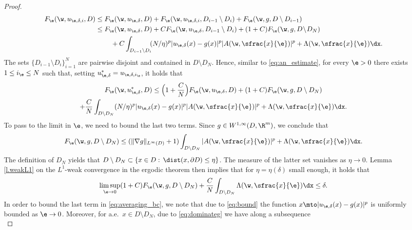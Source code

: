 \begin{proof}
\begin{align*}
F_{\e}(\w,u_{\e,\delta,i},D)&\leq F_{\e}(\w,u_{\e,\delta},D)+F_{\e}(\w,u_{\e,\delta,i},D_{i-1}\setminus D_i)+F_{\e}(\w,g,D\setminus D_{i-1})
\\
&\leq F_{\e}(\w,u_{\e,\delta},D)+C F_{\e}(\w,u_{\e,\delta},D_{i-1}\setminus D_i)+(1+C)F_{\e}(\w,g,D\!\setminus\! D_N)
\\
&\hspace*{.8cm} +C\int_{D_{i-1}\setminus D_i}\hspace*{-1mm}(N/\eta)^p |u_{\e,\delta}(x)-g(x)|^p|A(\w,\sfrac{x}{\e})|^p+\Lambda(\w,\sfrac{x}{\e})\dx.
\end{align*}
The sets $\{D_{i-1}\setminus D_i\}_{i=1}^N$ are pairwise disjoint and contained in $D\setminus D_N$. Hence, similar to \eqref{eq:an_estimate}, for every $\e>0$ there exists $1\leq i_{\e}\leq N$ such that, setting $u^*_{\e,\delta}=u_{\e,\delta,i_{\e}}$, it holds that
\begin{multline}\label{eq:averaging_bc}
F_{\e}(\w,u_{\e,\delta}^*,D)\leq \Bigl(1+\frac{C}{N}\Bigr)F_{\e}(\w,u_{\e,\delta},D)+(1+C)F_{\e}(\w,g,D\setminus D_N)
\\
+\frac{C}{N}\int_{D\setminus D_N}(N/\eta)^p |u_{\e,\delta}(x)-g(x)|^p|A(\w,\sfrac{x}{\e})|^p+\Lambda(\w,\sfrac{x}{\e})\dx.
\end{multline}
To pass to the limit in $\e$, we need to bound the last two terms. Since $g\in W^{1,\infty}(D,\R^m)$, we conclude that
\begin{equation*}
F_{\e}(\w,g,D\setminus D_N)\leq (\|\nabla g\|_{L^{\infty}(D)}+1)\int_{D\setminus D_N}|A(\w,\sfrac{x}{\e})|^p+\Lambda(\w,\sfrac{x}{\e})\dx.
\end{equation*}
The definition of $D_N$ yields that $D\setminus D_N\subset \{x\in D:\,\dist(x,\partial D)\leq \eta\}$. The measure of the latter set vanishes as $\eta\to 0$. Lemma \ref{l.weakL1} on the $L^1$-weak convergence in the ergodic theorem then implies that for $\eta=\eta(\delta)$ small enough, it holds that
\begin{equation}\label{eq:control_g}
\limsup_{\e\to 0}(1+C)F_{\e}(\w,g,D\setminus D_N)+\frac{C}{N}\int_{D\setminus D_N}\Lambda(\w,\sfrac{x}{\e})\dx\leq\delta.
\end{equation}
In order to bound the last term in \eqref{eq:averaging_bc}, we note that due to \eqref{eq:bound} the function $x\mto |u_{\e,\delta}(x)-g(x)|^p$ is uniformly bounded as $\e\to 0$. Moreover, for a.e.\ $x\in D\setminus D_N$, due to \eqref{eq:dominateg} we have along a subsequence
\begin{equation*}

\end{equation*}
\end{proof}
